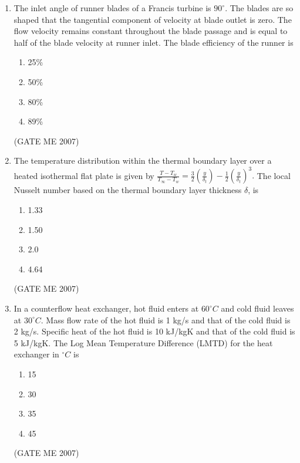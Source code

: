 \documentclass[journal]{IEEEtran}
\begin{document}
\begin{enumerate}
\item The inlet angle of runner blades of a Francis turbine is \( 90^\circ \). The blades are so shaped that the tangential component of velocity at blade outlet is zero. The flow velocity remains constant throughout the blade passage and is equal to half of the blade velocity at runner inlet. The blade efficiency of the runner is
\begin{multicols}{4}
\begin{enumerate}
\item 25\%
\item 50\%
\item 80\%
\item 89\%
\end{enumerate}
\end{multicols}
\hfill (GATE ME 2007)

\item The temperature distribution within the thermal boundary layer over a heated isothermal flat plate is given by \(\frac{T - T_w}{T_\infty - T_w} = \frac{3}{2} \left( \frac{y}{\delta_t} \right) - \frac{1}{2} \left( \frac{y}{\delta_t} \right)^3.\) The local Nusselt number based on the thermal boundary layer thickness \( \delta \), is
\begin{multicols}{4}
\begin{enumerate}
\item 1.33
\item 1.50
\item 2.0
\item 4.64
\end{enumerate}
\end{multicols}
\hfill (GATE ME 2007)

\item In a counterflow heat exchanger, hot fluid enters at \( 60^\circ C \) and cold fluid leaves at \( 30^\circ C \). Mass flow rate of the hot fluid is 1 kg/s and that of the cold fluid is 2 kg/s. Specific heat of the hot fluid is 10 kJ/kgK and that of the cold fluid is 5 kJ/kgK. The Log Mean Temperature Difference (LMTD) for the heat exchanger in \( ^\circ C \) is
\begin{multicols}{4}
\begin{enumerate}
\item 15
\item 30
\item 35
\item 45
\end{enumerate}
\end{multicols}
\hfill (GATE ME 2007)


\end{enumerate}
\end{document}
